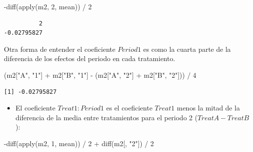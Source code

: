 \documentclass[
  12pt,
  a4paper,
  extrafontsizes,
  onecolumn,
  openright,
  table]{memoir}
\newenvironment{Shaded}{\begin{snugshade}}{\end{snugshade}}
\newcommand{\DecValTok}[1]{\textcolor[rgb]{0.68,0.00,0.00}{#1}}
\newcommand{\FunctionTok}[1]{\textcolor[rgb]{0.28,0.35,0.67}{#1}}
\newcommand{\NormalTok}[1]{\textcolor[rgb]{0.00,0.23,0.31}{#1}}
\newcommand{\SpecialCharTok}[1]{\textcolor[rgb]{0.37,0.37,0.37}{#1}}
\newcommand{\StringTok}[1]{\textcolor[rgb]{0.13,0.47,0.30}{#1}}
\providecommand{\tightlist}{%
  \setlength{\itemsep}{0pt}\setlength{\parskip}{0pt}}\usepackage{longtable,booktabs,array}
\begin{document}
\scriptsize

\begin{Shaded}
\begin{Highlighting}[]
\SpecialCharTok{{-}}\FunctionTok{diff}\NormalTok{(}\FunctionTok{apply}\NormalTok{(m2, }\DecValTok{2}\NormalTok{, mean)) }\SpecialCharTok{/} \DecValTok{2}
\end{Highlighting}
\end{Shaded}

\begin{verbatim}
          2 
-0.02795827 
\end{verbatim}

\normalsize

Otra forma de entender el coeficiente \(Period1\) es como la cuarta
parte de la diferencia de los efectos del periodo en cada tratamiento.

\scriptsize

\begin{Shaded}
\begin{Highlighting}[]
\NormalTok{(m2[}\StringTok{"A"}\NormalTok{, }\StringTok{"1"}\NormalTok{] }\SpecialCharTok{+}\NormalTok{ m2[}\StringTok{"B"}\NormalTok{, }\StringTok{"1"}\NormalTok{] }\SpecialCharTok{{-}}\NormalTok{ (m2[}\StringTok{"A"}\NormalTok{, }\StringTok{"2"}\NormalTok{] }\SpecialCharTok{+}\NormalTok{ m2[}\StringTok{"B"}\NormalTok{, }\StringTok{"2"}\NormalTok{])) }\SpecialCharTok{/} \DecValTok{4}
\end{Highlighting}
\end{Shaded}

\begin{verbatim}
[1] -0.02795827
\end{verbatim}

\normalsize

\begin{itemize}
\tightlist
\item
  El coeficiente \(Treat1:Period1\) es el coeficiente \(Treat1\) menos
  la mitad de la diferencia de la media entre tratamientos para el
  periodo 2 (\(TreatA-TreatB\)):
\end{itemize}

\scriptsize

\begin{Shaded}
\begin{Highlighting}[]
\SpecialCharTok{{-}}\FunctionTok{diff}\NormalTok{(}\FunctionTok{apply}\NormalTok{(m2, }\DecValTok{1}\NormalTok{, mean)) }\SpecialCharTok{/} \DecValTok{2} \SpecialCharTok{+} \FunctionTok{diff}\NormalTok{(m2[, }\StringTok{"2"}\NormalTok{]) }\SpecialCharTok{/} \DecValTok{2}
\end{Highlighting}
\end{Shaded}
\end{document}

